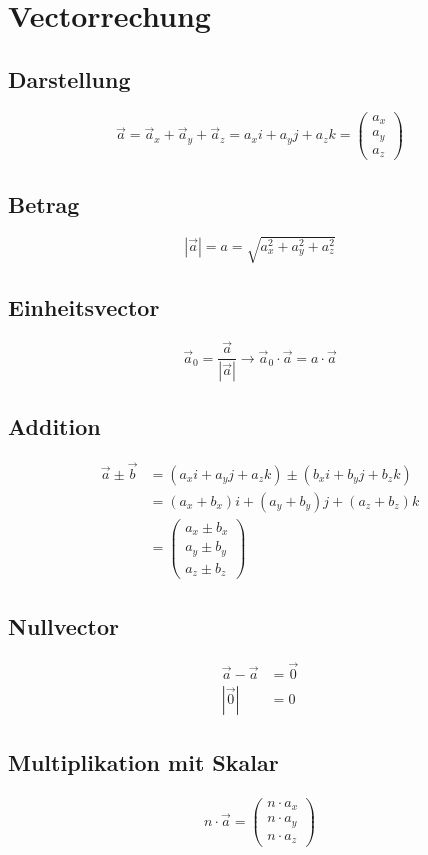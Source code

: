 \section{Vectorrechung}

\newcommand{\myvec}[3]{
\left(
    \begin{array}{c}
    #1 \\ #2 \\ #3
    \end{array}
\right)
}


\subsection{Darstellung}
$$
\vec{a}= \vec{a}_x +\vec{a}_y +\vec{a}_z = a_xi +a_yj + a_zk= \myvec{a_x}{a_y}{a_z}
$$

\subsection{Betrag}
$$
|\vec{a}|= a = \sqrt{a_x^2 +a_y^2 + a_z^2}
$$

\subsection{Einheitsvector}
$$
  \vec{a}_0 = \frac{\vec{a}}{|\vec{a}|}  \longrightarrow \vec{a}_0 \cdot \vec{a} = a \cdot \vec{a}
$$

\subsection{Addition}
\begin{align*}
  \vec{a} \pm \vec{b} &= (a_xi +a_yj + a_zk) \pm (b_xi +b_yj + b_zk)\\
  &= (a_x+b_x)i +(a_y+b_y)j + (a_z+b_z)k \\
  &=  \myvec{a_x \pm b_x}{a_y \pm b_y}{a_z \pm b_z}
\end{align*}

\subsection{Nullvector}
\begin{align*}
  \vec{a}-\vec{a}&= \vec{0} \\
  |\vec{0}|&=0
\end{align*}

\subsection{Multiplikation mit Skalar}
\begin{align*}
 n \cdot \vec{a} =   \myvec{n \cdot a_x}{n \cdot a_y}{n \cdot a_z}
\end{align*}

